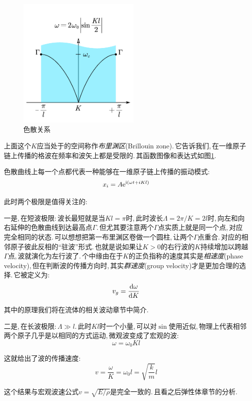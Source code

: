 \begin{figure}
\centering
\vspace{-1.5cm}
\includegraphics[width=6cm]{image/6-3-14.png}
\caption{色散关系}\label{6-3-14}
\end{figure}
上面这个$K$应当处于的空间称作\emph{布里渊区}(Brillouin zone).\,它告诉我们,\,在一维原子链上传播的格波在频率和波矢上都是受限的.\,其函数图像和表达式如图\ref{6-3-14}.

色散曲线上每一个点都代表一种能够在一维原子链上传播的振动模式:
\[x_i=A{\rm e}^{{\rm i}(\omega t+iKl)}\]

此时两个极限是值得关注的:

一是,\,在短波极限:\,波长最短就是当$Kl=\pi$时,\,此时波长$\Lambda=2\pi/K=2l$时,\,向左和向右延伸的色散曲线到达最高点$\Gamma$.\,但尤其要注意两个$\Gamma$点实质上就是同一个点,\,对应完全相同的状态.\,可以想想把第一布里渊区卷做一个圆柱,\,让两个$\Gamma$点重合.\,对应的相邻原子彼此反相的``驻波''形式.\,也就是说如果让$K>0$的右行波的$K$持续增加以跨越$\Gamma$点,\,波就演化为左行波了.\,个中缘由在于$K$的正负指称的速度其实是\emph{相速度}(phase velocity),\,但在判断波的传播方向时,\,其实\emph{群速度}(group velocity)才是更加合理的选择.\,它被定义为:
\[v_g=\frac{\textrm{d} \omega}{\textrm{d} K}\]

其中的原理我们将在流体的相关波动章节中简介.

二是,\,在长波极限:\,$\Lambda\gg l$.\,此时$Kl$时一个小量,\,可以对$\sin$使用近似,\,物理上代表相邻两个原子几乎是以相同的方式运动,\,微观波变成了宏观的波:
\[\omega=\omega_0Kl\]

这就给出了波的传播速度:
\[v=\frac{\omega}{K}=\omega_0 l=\sqrt{\frac{k}{m}}l\]

这个结果与宏观波速公式$v=\sqrt{E/\rho}$是完全一致的.\,且看之后弹性体章节的分析.

\vspace{1cm}

